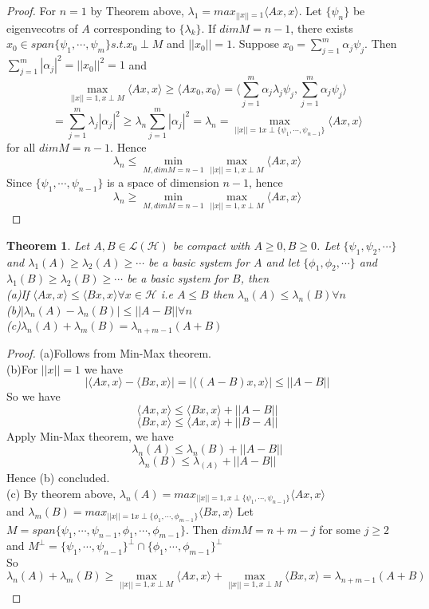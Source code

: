 \documentclass{article}
\newtheorem{Thm}{Theorem}[section]
\newcommand{\HH}{\mathcal{H}}
\newcommand{\LL}{\mathcal{L}}
\begin{document}
\begin{proof}
	For $n=1$ by Theorem above, $\lambda_1 = max_{||x||=1}\langle Ax,x\rangle$. Let $\{\psi_n\}$ be eigenvecotrs of $A$ corresponding to $\{\lambda_k\}$. If $dim M = n-1$, there exists $x_0\in span\{\psi_1,\cdots, \psi_m\} s.t. x_0\perp M$ and $||x_0||=1$. Suppose $x_0=\sum_{j=1}^{m}\alpha_j \psi_j$. Then $\sum_{j=1}^{m}|\alpha_j|^2 = ||x_0||^2 = 1$ and
	\[\max_{||x||=1, x \perp M} \langle Ax,x \rangle \geq \langle Ax_0,x_0 \rangle =\langle \sum_{j=1}^{m}\alpha_j \lambda_j \psi_j,  \sum_{j=1}^{m}\alpha_j \psi_j \rangle \]
	\[= \sum_{j=1}^{m} \lambda_j |\alpha_j|^2 \geq \lambda_n \sum_{j=1}^{m}|\alpha_j|^2 = \lambda_n = \max_{||x||=1 x\perp \{\psi_1, \cdots, \psi_{n-1}\}}\langle Ax,x\rangle \]
	for all $dim M=n-1$. Hence 
	\[\lambda_n \leq \min_{M, dim M = n-1} \max_{||x||=1, x \perp M} \langle Ax,x \rangle\]
	Since $\{\psi_1, \cdots, \psi_{n-1}\}$ is a space of dimension $n-1$, hence
	\[\lambda_n \geq \min_{M, dim M = n-1} \max_{||x||=1, x \perp M} \langle Ax,x \rangle\]
\end{proof}
\begin{Thm}
	Let $A,B\in \LL(\HH)$ be compact with $A\geq 0, B\geq 0$. Let $\{\psi_1,\psi_2,\cdots \}$ and $\lambda_1(A)\geq\lambda_2(A)\geq\cdots$ be a basic system for $A$  and let $\{\phi_1,\phi_2,\cdots \}$ and $\lambda_1(B)\geq\lambda_2(B)\geq\cdots$ be a basic system for $B$, then\\
	(a)If $\langle Ax,x \rangle \leq \langle Bx,x \rangle \forall x\in\HH $ i.e $A\leq B$ then $\lambda_n(A)\leq\lambda_n(B)\forall n$\\
	(b)$|\lambda_n(A)-\lambda_n(B)|\leq ||A-B|| \forall n$\\
	(c)$\lambda_n(A)+\lambda_m(B)=\lambda_{n+m-1}(A+B)$\\
\end{Thm}
\begin{proof}
	(a)Follows from Min-Max theorem.\\
	(b)For $||x||=1$ we have
	\[|\langle Ax,x \rangle -\langle Bx,x\rangle |=|\langle (A-B)x,x\rangle|\leq ||A-B||\]
	So we have
	\[ \langle Ax,x\rangle \leq \langle Bx, x \rangle + ||A-B||\]
	\[ \langle Bx,x\rangle \leq \langle Ax, x \rangle + ||B-A||\]
	Apply Min-Max theorem, we have
	\[\lambda_n(A)\leq\lambda_n(B)+||A-B||\]
	\[\lambda_n(B)\leq\lambda_(A)+||A-B||\]
	Hence (b) concluded.\\
	(c) By theorem above, $\lambda_n(A)=max_{||x||=1, x\perp\{\psi_1,\cdots,\psi_{n-1}\}}\langle Ax,x\rangle$ \\and $\lambda_m(B)=max_{||x||=1 x\perp\{\phi_1,\cdots,\phi_{m-1}\}}\langle Bx,x\rangle$ Let $M=span\{\psi_1,\cdots,\psi_{n-1},\phi_1,\cdots,\phi_{m-1}\}$. Then $dim M= n+m-j$ for some $j\geq 2$ \\and $M^\perp=\{\psi_1,\cdots,\psi_{n-1}\}^\perp \cap \{\phi_1,\cdots,\phi_{m-1}\}^\perp$ \\So \[\lambda_n(A)+\lambda_m(B) \geq \max_{||x||=1,x\perp M}\langle Ax,x\rangle + \max_{||x||=1,x\perp M}\langle Bx,x\rangle= \lambda_{n+m-1}(A+B)\] 
\end{proof}
\end{document}
